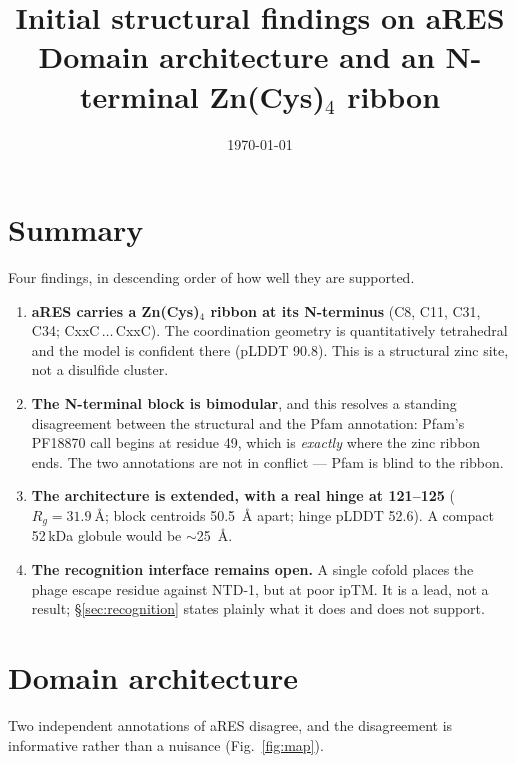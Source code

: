 \documentclass[11pt,a4paper]{article}
\title{\textbf{Initial structural findings on aRES}\\[2pt]
       \large Domain architecture and an N-terminal Zn(Cys)$_4$ ribbon}
\author{}
\date{\today}
\begin{document}
\maketitle
\vspace{-2.2em}

\section*{Summary}

Four findings, in descending order of how well they are supported.

\begin{enumerate}\itemsep3pt
\item \textbf{aRES carries a Zn(Cys)$_4$ ribbon at its N-terminus} (C8, C11, C31,
      C34; CxxC\,$\dots$\,CxxC). The coordination geometry is quantitatively
      tetrahedral and the model is confident there (pLDDT 90.8). This is a
      structural zinc site, not a disulfide cluster.
\item \textbf{The N-terminal block is bimodular}, and this resolves a standing
      disagreement between the structural and the Pfam annotation: Pfam's
      PF18870 call begins at residue 49, which is \emph{exactly} where the zinc
      ribbon ends. The two annotations are not in conflict --- Pfam is blind to
      the ribbon.
\item \textbf{The architecture is extended, with a real hinge at 121--125}
      ($R_g = \SI{31.9}{\angstrom}$; block centroids \SI{50.5}{\angstrom} apart;
      hinge pLDDT 52.6). A compact 52\,kDa globule would be
      $\sim$\SI{25}{\angstrom}.
\item \textbf{The recognition interface remains open.} A single cofold places
      the phage escape residue against NTD-1, but at poor ipTM. It is a lead,
      not a result; \S\ref{sec:recognition} states plainly what it does and does
      not support.
\end{enumerate}

\section{Domain architecture}
\label{sec:domains}

Two independent annotations of aRES disagree, and the disagreement is
informative rather than a nuisance (Fig.~\ref{fig:map}).
\end{document}
